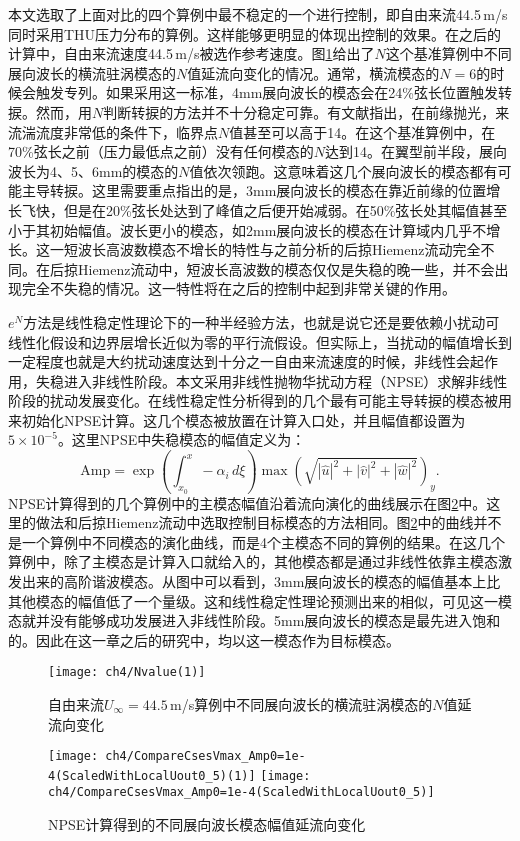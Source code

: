 本文选取了上面对比的四个算例中最不稳定的一个进行控制，即自由来流44.5\,m/s同时采用THU压力分布的算例。这样能够更明显的体现出控制的效果。在之后的计算中，自由来流速度44.5\,m/s被选作参考速度。图\ref{fig:Nfactor445}给出了$N$这个基准算例中不同展向波长的横流驻涡模态的$N$值延流向变化的情况。通常，横流模态的$N=6$的时候会触发专列。如果采用这一标准，4mm展向波长的模态会在24\%弦长位置触发转捩。然而，用$N$判断转捩的方法并不十分稳定可靠。有文献指出\cite{saric2011}，在前缘抛光，来流湍流度非常低的条件下，临界点$N$值甚至可以高于14。在这个基准算例中，在70\%弦长之前（压力最低点之前）没有任何模态的$N$达到14。在翼型前半段，展向波长为4、5、6mm的模态的$N$值依次领跑。这意味着这几个展向波长的模态都有可能主导转捩。这里需要重点指出的是，3mm展向波长的模态在靠近前缘的位置增长飞快，但是在20\%弦长处达到了峰值之后便开始减弱。在50\%弦长处其幅值甚至小于其初始幅值。波长更小的模态，如2mm展向波长的模态在计算域内几乎不增长。这一短波长高波数模态不增长的特性与之前分析的后掠Hiemenz流动完全不同。在后掠Hiemenz流动中，短波长高波数的模态仅仅是失稳的晚一些，并不会出现完全不失稳的情况。这一特性将在之后的控制中起到非常关键的作用。

$e^{N}$方法是线性稳定性理论下的一种半经验方法，也就是说它还是要依赖小扰动可线性化假设和边界层增长近似为零的平行流假设。但实际上，当扰动的幅值增长到一定程度也就是大约扰动速度达到十分之一自由来流速度的时候，非线性会起作用，失稳进入非线性阶段。本文采用非线性抛物华扰动方程（NPSE）求解非线性阶段的扰动发展变化。在线性稳定性分析得到的几个最有可能主导转捩的模态被用来初始化NPSE计算。这几个模态被放置在计算入口处，并且幅值都设置为$5\times10^{-5}$。这里NPSE中失稳模态的幅值定义为：
\begin{equation}
\mathrm{Amp}=\exp\!\left(\int_{x_0}^x -\alpha _i\,d\xi\right)\max\!\left(\sqrt{\left| \hat{u} \right|^2+\left| \hat{v} \right|^2+\left| \hat{w} \right|^2}\right)_y.
\end{equation}
NPSE计算得到的几个算例中的主模态幅值沿着流向演化的曲线展示在图\ref{f:NPSE}中。这里的做法和后掠Hiemenz流动中选取控制目标模态的方法相同。图\ref{f:NPSE}中的曲线并不是一个算例中不同模态的演化曲线，而是4个主模态不同的算例的结果。在这几个算例中，除了主模态是计算入口就给入的，其他模态都是通过非线性依靠主模态激发出来的高阶谐波模态。从图中可以看到，3mm展向波长的模态的幅值基本上比其他模态的幅值低了一个量级。这和线性稳定性理论预测出来的相似，可见这一模态就并没有能够成功发展进入非线性阶段。5mm展向波长的模态是最先进入饱和的。因此在这一章之后的研究中，均以这一模态作为目标模态。
\begin{figure}
\centering
  \texttt{[image: ch4/Nvalue(1)]}
  \caption{自由来流$U_\infty= 44.5$\,m/s算例中不同展向波长的横流驻涡模态的$N$值延流向变化}%
  \label{fig:Nfactor445}
\end{figure}
\begin{figure}
\centering
  \texttt{[image: ch4/CompareCsesVmax\_Amp0=1e-4(ScaledWithLocalUout0\_5)(1)]} \texttt{[image: ch4/CompareCsesVmax\_Amp0=1e-4(ScaledWithLocalUout0\_5)]}
  \caption{NPSE计算得到的不同展向波长模态幅值延流向变化}\label{f:NPSE}%
\end{figure}



